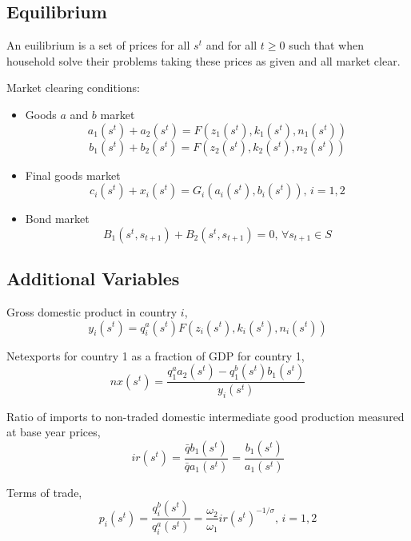 \documentclass[11pt,a4paper]{article}
\begin{document}
\subsection{Equilibrium}
An euilibrium is a set of prices for all $s^t$ and for all $t\geq 0$ such that when household solve their problems taking these prices as given and all market clear.

Market clearing conditions:
\begin{itemize}
	\item  Goods $a$ and $b$ market
    \begin{equation}
    a_1(s^t)+a_2(s^t)=F(z_1(s^t),k_1(s^t),n_1(s^t))
    \end{equation}
    \begin{equation}
    b_1(s^t)+b_2(s^t)=F(z_2(s^t),k_2(s^t),n_2(s^t))
    \end{equation}
    \item Final goods market
    \begin{equation}
    c_i(s^t)+x_i(s^t)=G_i(a_i(s^t),b_i(s^t)),\, i=1,2
    \end{equation}
    \item Bond market
    \begin{equation}
    B_1(s^t,s_{t+1})+B_2(s^t,s_{t+1})=0,\, \forall s_{t+1}\in S
    \end{equation}
    
\end{itemize}

\subsection{Additional Variables}
Gross domestic product in country $i$,
\begin{equation}
y_i(s^t)=q_i^a(s^t)F(z_i(s^t),k_i(s^t),n_i(s^t))
\end{equation}

Netexports for country 1 as a fraction of GDP for country 1,
\begin{equation}
nx(s^t)=\frac{q_1^aa_2(s^t)-q_1^b(s^t)b_1(s^t)}{y_i(s^t)}
\end{equation}

Ratio of imports to non-traded domestic intermediate good production measured at base year prices,
\begin{equation}
ir(s^t)=\frac{\bar{q}b_1(s^t)}{\bar{q}a_1(s^t)}=\frac{b_1(s^t)}{a_1(s^t)}
\end{equation}

Terms of trade,
\begin{equation}
p_i(s^t)=\frac{q_i^b(s^t)}{q_i^a(s^t)}=\frac{\omega_2}{\omega_1}{ir(s^t)}^{-1/\sigma},\,i=1,2
\end{equation}
\end{document}
